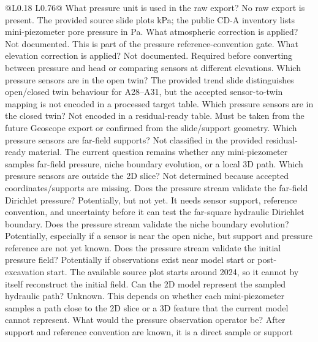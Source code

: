 \begin{longtable}{@{}L{0.18\textwidth} L{0.76\textwidth}@{}}
{ What pressure unit is used in the raw export?}
{No raw export is present.  The provided source slide plots kPa; the public CD-A
inventory lists mini-piezometer pore pressure in Pa.}
{ What atmospheric correction is applied?}
{Not documented.  This is part of the pressure reference-convention gate.}
{ What elevation correction is applied?}
{Not documented.  Required before converting between pressure and head or comparing
sensors at different elevations.}
{ Which pressure sensors are in the open twin?}
{The provided trend slide distinguishes open/closed twin behaviour for A28--A31, but the
accepted sensor-to-twin mapping is not encoded in a processed target table.}
{ Which pressure sensors are in the closed twin?}
{Not encoded in a residual-ready table.  Must be taken from the future Geoscope export
or confirmed from the slide/support geometry.}
{ Which pressure sensors are far-field supports?}
{Not classified in the provided residual-ready material.  The current question remains whether any mini-piezometer
samples far-field pressure, niche boundary evolution, or a local 3D path.}
{ Which pressure sensors are outside the 2D slice?}
{Not determined because accepted coordinates/supports are missing.}
{ Does the pressure stream validate the far-field Dirichlet pressure?}
{Potentially, but not yet.  It needs sensor support, reference convention, and
uncertainty before it can test the far-square hydraulic Dirichlet boundary.}
{ Does the pressure stream validate the niche boundary evolution?}
{Potentially, especially if a sensor is near the open niche, but support and pressure
reference are not yet known.}
{ Does the pressure stream validate the initial pressure field?}
{Potentially if observations exist near model start or post-excavation start.  The
available source plot starts around 2024, so it cannot by itself reconstruct the
initial field.}
{ Can the 2D model represent the sampled hydraulic path?}
{Unknown.  This depends on whether each mini-piezometer samples a path close to the
2D slice or a 3D feature that the current model cannot represent.}
{ What would the pressure observation operator be?}
{After support and reference convention are known, it is a direct sample or support
}
\end{longtable}
